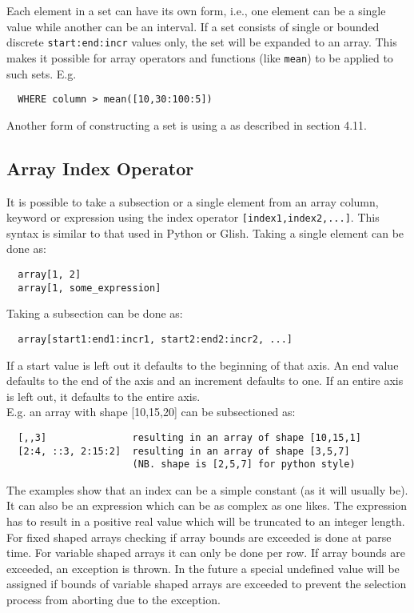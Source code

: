 Each element in a set can have its own form, i.e., one element can
be a single value while another can be an interval.
If a set consists of single or bounded discrete
\texttt{start:end:incr} values only, the set will be expanded to an
array.
This makes it possible for array operators and functions
(like \texttt{mean}) to be applied to such sets. E.g.
\begin{verbatim}
  WHERE column > mean([10,30:100:5])
\end{verbatim}

Another form of constructing a set is using a
 as described in section 4.11.

\subsection{\label{TAQL:INDEXING}Array Index Operator}
It is possible to take a subsection or a
single element from an array column, keyword or expression
using the index operator
\texttt{[index1,index2,...]}. This syntax
is similar to that used in Python or Glish.
Taking a single element can be done as:
\begin{verbatim}
  array[1, 2]
  array[1, some_expression]
\end{verbatim}
Taking a subsection can be done as:
\begin{verbatim}
  array[start1:end1:incr1, start2:end2:incr2, ...]
\end{verbatim}
If a start value is left out it defaults to the beginning of
that axis. An end value defaults to the end of the axis and
an increment defaults to one. If an entire axis is left out,
it defaults to the entire axis.
\\E.g. an array with shape [10,15,20] can be subsectioned as:
\begin{verbatim}
  [,,3]               resulting in an array of shape [10,15,1]
  [2:4, ::3, 2:15:2]  resulting in an array of shape [3,5,7]
                      (NB. shape is [2,5,7] for python style)
\end{verbatim}
The examples show that an index can be a simple constant (as it will
usually be). It can also be an expression which can be as complex
as one likes. The expression has to result in a positive real value
which will be truncated to an integer length.
\\For fixed shaped arrays checking if array bounds are exceeded
is done at parse time.
For variable shaped arrays
it can only be done per row. If array bounds are exceeded,
an exception is thrown. In the future a special undefined value
will be assigned if bounds of variable shaped arrays are exceeded
to prevent the selection process from aborting due to the exception.

